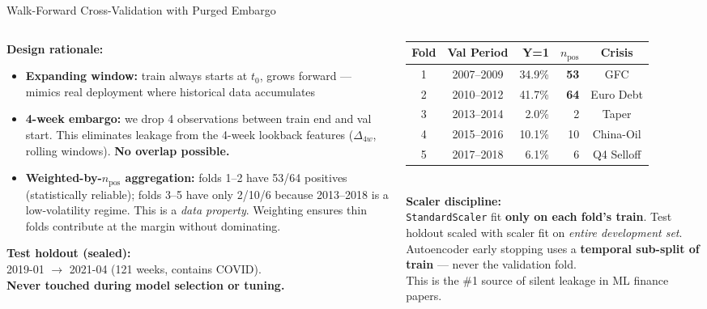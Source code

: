 \documentclass[aspectratio=169, 11pt]{beamer}
\begin{document}
\begin{frame}{Walk-Forward Cross-Validation with Purged Embargo}
\begin{columns}[T]
\begin{column}{0.55\textwidth}
  \textbf{Design rationale:}
  \begin{itemize}\setlength\itemsep{0.1cm}
    \item \textbf{Expanding window:} train always starts at $t_0$, grows forward --- mimics real deployment where historical data accumulates
    \item \textbf{4-week embargo:} we drop 4 observations between train end and val start. This eliminates leakage from the 4-week lookback features ($\Delta_{4w}$, rolling windows). \textbf{No overlap possible.}
    \item \textbf{Weighted-by-$n_{\text{pos}}$ aggregation:} folds 1--2 have 53/64 positives (statistically reliable); folds 3--5 have only 2/10/6 because 2013--2018 is a low-volatility regime. This is a \textit{data property}. Weighting ensures thin folds contribute at the margin without dominating.
  \end{itemize}

  \textbf{Test holdout (sealed):}\\
  2019-01 $\rightarrow$ 2021-04 (121 weeks, contains COVID).\\
  \textbf{Never touched during model selection or tuning.}
\end{column}
\begin{column}{0.43\textwidth}
  \footnotesize
  \begin{tabular}{ccrrc}
    \toprule
    \textbf{Fold} & \textbf{Val Period} & \textbf{Y=1} & $n_{\text{pos}}$ & \textbf{Crisis}\\
    \midrule
    1 & 2007--2009 & 34.9\% & \textbf{53} & GFC\\
    2 & 2010--2012 & 41.7\% & \textbf{64} & Euro Debt\\
    3 & 2013--2014 & 2.0\% & 2 & Taper\\
    4 & 2015--2016 & 10.1\% & 10 & China-Oil\\
    5 & 2017--2018 & 6.1\% & 6 & Q4 Selloff\\
    \bottomrule
  \end{tabular}\\[0.3cm]

  \normalsize
  \textbf{Scaler discipline:}\\
  \footnotesize
  \texttt{StandardScaler} fit \textbf{only on each fold's train}. Test holdout scaled with scaler fit on \textit{entire development set}. Autoencoder early stopping uses a \textbf{temporal sub-split of train} --- never the validation fold.\\[0.2cm]
  This is the \#1 source of silent leakage in ML finance papers.
\end{column}
\end{columns}
\end{frame}
\end{document}
